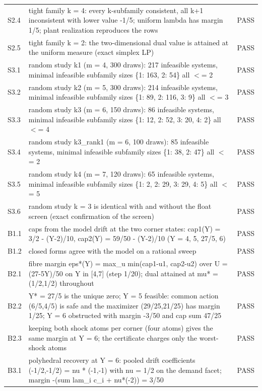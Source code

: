 \documentclass[11pt,a4paper]{article}
\theoremstyle{plain}
\theoremstyle{definition}
\theoremstyle{remark}
\begin{document}
\begin{footnotesize}
\begin{longtable}{p{1.1cm}p{12.6cm}p{0.9cm}}
S2.4 & tight family k = 4: every k-subfamily consistent, all k+1 inconsistent with lower value -1/5; uniform lambda has margin 1/5; plant realization reproduces the rows & PASS\\
S2.5 & tight family k = 2: the two-dimensional dual value is attained at the uniform measure (exact simplex LP) & PASS\\
S3.1 & random study k1 (m = 4, 300 draws): 217 infeasible systems, minimal infeasible subfamily sizes \{1: 163, 2: 54\} all $<$= 2 & PASS\\
S3.2 & random study k2 (m = 5, 300 draws): 214 infeasible systems, minimal infeasible subfamily sizes \{1: 89, 2: 116, 3: 9\} all $<$= 3 & PASS\\
S3.3 & random study k3 (m = 6, 150 draws): 86 infeasible systems, minimal infeasible subfamily sizes \{1: 12, 2: 52, 3: 20, 4: 2\} all $<$= 4 & PASS\\
S3.4 & random study k3\_rank1 (m = 6, 100 draws): 85 infeasible systems, minimal infeasible subfamily sizes \{1: 38, 2: 47\} all $<$= 2 & PASS\\
S3.5 & random study k4 (m = 7, 120 draws): 65 infeasible systems, minimal infeasible subfamily sizes \{1: 2, 2: 29, 3: 29, 4: 5\} all $<$= 5 & PASS\\
S3.6 & random study k = 3 is identical with and without the float screen (exact confirmation of the screen) & PASS\\
B1.1 & caps from the model drift at the two corner states: cap1(Y) = 3/2 - (Y-2)/10, cap2(Y) = 59/50 - (Y-2)/10 (Y = 4, 5, 27/5, 6) & PASS\\
B1.2 & closed forms agree with the model on a rational sweep & PASS\\
B2.1 & fibre margin eps*(Y) = max\_u min(cap1-u1, cap2-u2) over U = (27-5Y)/50 on Y in [4,7] (step 1/20); dual attained at mu* = (1/2,1/2) throughout & PASS\\
B2.2 & Y* = 27/5 is the unique zero; Y = 5 feasible: common action (6/5,4/5) is safe and the maximizer (29/25,21/25) has margin 1/25; Y = 6 obstructed with margin -3/50 and cap sum 47/25 & PASS\\
B2.3 & keeping both shock atoms per corner (four atoms) gives the same margin at Y = 6; the certificate charges only the worst-shock atoms & PASS\\
B3.1 & polyhedral recovery at Y = 6: pooled drift coefficients (-1/2,-1/2) = nu * (-1,-1) with nu = 1/2 on the demand facet; margin -(sum lam\_i c\_i + nu*(-2)) = 3/50 & PASS\\

\end{longtable}
\end{footnotesize}
\end{document}
